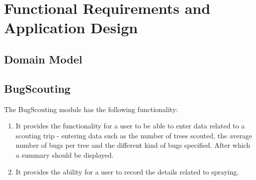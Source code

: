 \documentclass[11pt,a4paper,titlepage]{article}
\begin{document}
\section{Functional Requirements and Application Design}
	\subsection{Domain Model}
	

	\subsection{BugScouting}
		The BugScouting module has the following functionality:
		\begin{enumerate}
			\item It provides the functionality for a user to be able to enter data related to a scouting trip - entering data such as the number of trees scouted, the average number of bugs per tree and the different kind of bugs specified. After which a summary should be displayed.
			\item It provides the ability for a user to record the details related to spraying.
		\end{enumerate}
\end{document}
